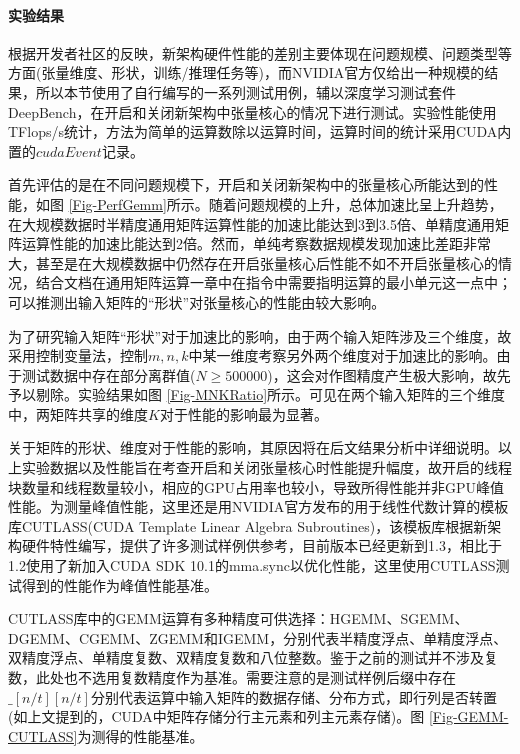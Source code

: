\paragraph{实验结果}
\par 根据开发者社区的反映，新架构硬件性能的差别主要体现在问题规模、问题类型等方面(张量维度、形状，训练/推理任务等)，而NVIDIA官方仅给出一种规模的结果，所以本节使用了自行编写的一系列测试用例，辅以深度学习测试套件DeepBench\cite{DEEPBENCH}，在开启和关闭新架构中张量核心的情况下进行测试。实验性能使用TFlops/s统计，方法为简单的运算数除以运算时间，运算时间的统计采用CUDA内置的$ cudaEvent $记录。
\par 首先评估的是在不同问题规模下，开启和关闭新架构中的张量核心所能达到的性能，如图 \ref{Fig-PerfGemm}所示。随着问题规模的上升，总体加速比呈上升趋势，在大规模数据时半精度通用矩阵运算性能的加速比能达到3到3.5倍、单精度通用矩阵运算性能的加速比能达到2倍。然而，单纯考察数据规模发现加速比差距非常大，甚至是在大规模数据中仍然存在开启张量核心后性能不如不开启张量核心的情况，结合文档在通用矩阵运算一章中在指令中需要指明运算的最小单元这一点中\cite{PTX}；可以推测出输入矩阵的“形状”对张量核心的性能由较大影响。
\par 为了研究输入矩阵“形状”对于加速比的影响，由于两个输入矩阵涉及三个维度，故采用控制变量法，控制$ m,n,k $中某一维度考察另外两个维度对于加速比的影响。由于测试数据中存在部分离群值($ N\geq 500000 $)，这会对作图精度产生极大影响，故先予以剔除。实验结果如图 \ref{Fig-MNKRatio}所示。可见在两个输入矩阵的三个维度中，两矩阵共享的维度$ K $对于性能的影响最为显著。
\par 关于矩阵的形状、维度对于性能的影响，其原因将在后文结果分析中详细说明。以上实验数据以及性能旨在考查开启和关闭张量核心时性能提升幅度，故开启的线程块数量和线程数量较小，相应的GPU占用率也较小，导致所得性能并非GPU峰值性能。为测量峰值性能，这里还是用NVIDIA官方发布的用于线性代数计算的模板库CUTLASS(CUDA Template Linear Algebra Subroutines)，该模板库根据新架构硬件特性编写，提供了许多测试样例供参考，目前版本已经更新到1.3，相比于1.2使用了新加入CUDA SDK 10.1的mma.sync以优化性能，这里使用CUTLASS测试得到的性能作为峰值性能基准。
\par CUTLASS库中的GEMM运算有多种精度可供选择：HGEMM、SGEMM、DGEMM、CGEMM、ZGEMM和IGEMM，分别代表半精度浮点、单精度浮点、双精度浮点、单精度复数、双精度复数和八位整数。鉴于之前的测试并不涉及复数，此处也不选用复数精度作为基准。需要注意的是测试样例后缀中存在$ \_[n/t][n/t] $分别代表运算中输入矩阵的数据存储、分布方式，即行列是否转置(如上文提到的，CUDA中矩阵存储分行主元素和列主元素存储)。图 \ref{Fig-GEMM-CUTLASS}为测得的性能基准。

